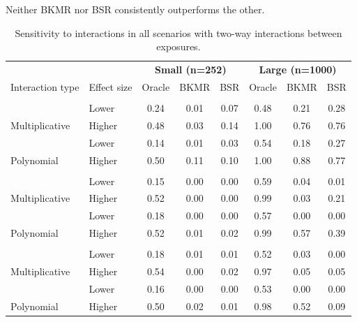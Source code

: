 \documentclass[12pt, twoside]{amherstthesis}
\begin{document}
Neither BKMR nor BSR consistently outperforms the other.
\begin{table}

\caption{\label{tab:twowaytab}Sensitivity to interactions in all scenarios with two-way interactions between exposures.}
\centering
\begin{tabular}[t]{llcccccc}
\toprule
\multicolumn{2}{c}{\textbf{ }} & \multicolumn{3}{c}{\textbf{Small (n=252)}} & \multicolumn{3}{c}{\textbf{Large (n=1000)}} \\
\cmidrule(l{3pt}r{3pt}){3-5} \cmidrule(l{3pt}r{3pt}){6-8}
Interaction type & Effect size & Oracle & BKMR & BSR & Oracle & BKMR & BSR\\
\midrule
\addlinespace[0.3em]
\multicolumn{8}{l}{\textbf{Hg-Ni}}\\
 & Lower & 0.24 & 0.01 & 0.07 & 0.48 & 0.21 & 0.28\\

\multirow{-2}{*}{\raggedright\arraybackslash \hspace{1em}Multiplicative} & Higher & 0.48 & 0.03 & 0.14 & 1.00 & 0.76 & 0.76\\
\addlinespace
 & Lower & 0.14 & 0.01 & 0.03 & 0.54 & 0.18 & 0.27\\

\multirow{-2}{*}{\raggedright\arraybackslash \hspace{1em}Polynomial} & Higher & 0.50 & 0.11 & 0.10 & 1.00 & 0.88 & 0.77\\
\addlinespace
\addlinespace[0.3em]
\multicolumn{8}{l}{\textbf{Cd-As}}\\
 & Lower & 0.15 & 0.00 & 0.00 & 0.59 & 0.04 & 0.01\\

\multirow{-2}{*}{\raggedright\arraybackslash \hspace{1em}Multiplicative} & Higher & 0.52 & 0.00 & 0.00 & 0.99 & 0.03 & 0.21\\
\addlinespace
 & Lower & 0.18 & 0.00 & 0.00 & 0.57 & 0.00 & 0.00\\

\multirow{-2}{*}{\raggedright\arraybackslash \hspace{1em}Polynomial} & Higher & 0.52 & 0.01 & 0.02 & 0.99 & 0.57 & 0.39\\
\addlinespace
\addlinespace[0.3em]
\multicolumn{8}{l}{\textbf{Ni-Co}}\\
 & Lower & 0.18 & 0.01 & 0.01 & 0.52 & 0.03 & 0.00\\

\multirow{-2}{*}{\raggedright\arraybackslash \hspace{1em}Multiplicative} & Higher & 0.54 & 0.00 & 0.02 & 0.97 & 0.05 & 0.05\\
\addlinespace
 & Lower & 0.16 & 0.00 & 0.00 & 0.53 & 0.00 & 0.00\\

\multirow{-2}{*}{\raggedright\arraybackslash \hspace{1em}Polynomial} & Higher & 0.50 & 0.02 & 0.01 & 0.98 & 0.52 & 0.09\\
\bottomrule
\end{tabular}
\end{table}
\end{document}
